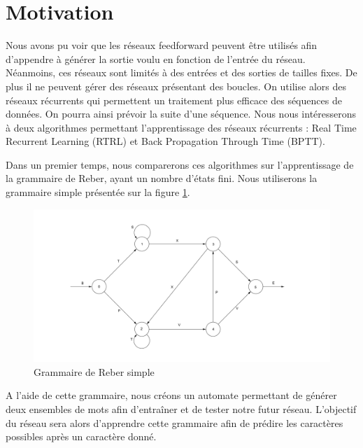 \documentclass{report}
\begin{document}
\section{Motivation}
Nous avons pu voir que les réseaux feedforward peuvent être utilisés afin d'appendre à générer la sortie voulu en fonction de l'entrée du réseau. 
Néanmoins, ces réseaux sont limités à des entrées et des sorties de tailles fixes. De plus il ne peuvent gérer des réseaux présentant des boucles. On utilise alors des réseaux récurrents qui permettent un traitement plus efficace des séquences de données. On pourra ainsi prévoir la suite d'une séquence.
\bigbreak
Nous nous intéresserons à deux algorithmes permettant l'apprentissage des réseaux récurrents : Real Time Recurrent Learning (RTRL) et Back Propagation Through Time (BPTT).

Dans un premier temps, nous comparerons ces algorithmes sur l'apprentissage de la grammaire de Reber, ayant un nombre d'états fini. Nous utiliserons la grammaire simple présentée sur la figure \ref{Grammaire de Reber simple}.

\begin{figure}[h!]
\begin{center}
\includegraphics[scale=0.3]{images/reber_simple.png}
\caption{Grammaire de Reber simple}
\label{Grammaire de Reber simple}
\end{center}
\end{figure}

A l'aide de cette grammaire, nous créons un automate permettant de générer deux ensembles de mots afin d'entraîner et de tester notre futur réseau. L'objectif du réseau sera alors d'apprendre cette grammaire afin de prédire les caractères possibles après un caractère donné.
\end{document}

